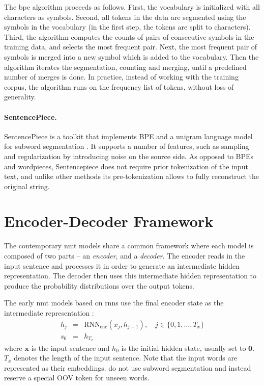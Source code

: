 The \acrshort{bpe} algorithm %
proceeds as follows. First, the vocabulary is initialized with all characters
as symbols. Second, all tokens in the data are segmented using the symbols in
the vocabulary (in the first step, the tokens are split to characters).  Third,
the algorithm computes the counts of pairs of consecutive symbols in the
training data, and selects the most frequent pair. Next, the most frequent pair
of symbols is merged into a new symbol which is added to the vocabulary. Then
the algorithm iterates the segmentation, counting and merging, until a
predefined number of merges is done. In practice, instead of working with the
training corpus, the algorithm runs on the frequency list of tokens, without
loss of generality.

\paragraph{SentencePiece.}   SentencePiece
\citep{kudo2018sentencepiece} is a toolkit that implements BPE and a unigram
language model for subword segmentation \citep{kudo-2018-subword}. It supports a
number of features, such as sampling and regularization by introducing noise on
the source side. As opposed to BPEs and wordpieces, Sentencepiece does not
require prior tokenization of the input text, and unlike other methods its
pre-tokenization allows to fully reconstruct the original string.

\section{Encoder-Decoder Framework}
\label{sec:encdec}

The contemporary \gls{nmt} models share a common framework where each model is
composed of two parts -- an \emph{encoder}, and a \emph{decoder}. The encoder
reads in the input sentence and processes it in order to generate an
intermediate hidden representation.  The decoder then uses this intermediate
hidden representation to produce the probability distributions over the output
tokens.

The early \gls{nmt} models based on \glspl{rnn} use the final encoder state as
the intermediate representation \citep{sutskever2014sequence}:
%
\begin{eqnarray} h_j & = & \mathrm{RNN}_{\text{enc}}(x_j, h_{j-1}), \quad j \in
\{0, 1, \ldots, T_x \} \\ s_0 & = & h_{T_x}
\end{eqnarray}
%
where $\mathbf{x}$ is the input sentence and $h_0$ is the initial hidden state,
usually set to $\mathbf{0}$. $T_x$ denotes the length of the input sentence.
Note that the input words are represented as their embeddings.
\citet{sutskever2014sequence} do not use subword segmentation and instead
reserve a special OOV token for unseen words.

